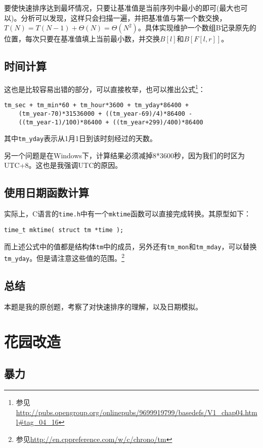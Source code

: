 \documentclass[hyperref,UTF8,12pt,a4paper]{ctexart}
\begin{document}
要使快速排序达到最坏情况，只要让基准值是当前序列中最小的即可(最大也可以)。分析可以发现，这样只会扫描一遍，并把基准值与第一个数交换，$T(N)=T(N-1)+\Theta(N)=\Theta(N^2)$。具体实现维护一个数组B记录原先的位置，每次只要在基准值填上当前最小数，并交换$B[l]$和$B[F[l, r]]$。

\subsection{时间计算}

这也是比较容易出错的部分，可以直接枚举，也可以推出公式\footnote{参见\url{http://pubs.opengroup.org/onlinepubs/9699919799/basedefs/V1_chap04.html\#tag_04_16}}：

\begin{verbatim}
tm_sec + tm_min*60 + tm_hour*3600 + tm_yday*86400 +
    (tm_year-70)*31536000 + ((tm_year-69)/4)*86400 -
    ((tm_year-1)/100)*86400 + ((tm_year+299)/400)*86400
\end{verbatim}

其中\verb|tm_yday|表示从1月1日到该时刻经过的天数。

另一个问题是在Windows下，计算结果必须减掉8*3600秒，因为我们的时区为UTC+8。这也是我强调UTC的原因。

\subsection{使用日期函数计算}

实际上，C语言的\verb|time.h|中有一个\verb|mktime|函数可以直接完成转换。其原型如下：

\begin{verbatim}
time_t mktime( struct tm *time );
\end{verbatim}

而上述公式中的值都是结构体\verb|tm|中的成员，另外还有\verb|tm_mon|和\verb|tm_mday|，可以替换\verb|tm_yday|。但是请注意这些值的范围。\footnote{参见\url{http://en.cppreference.com/w/c/chrono/tm}}

\subsection{总结}

本题是我的原创题，考察了对快速排序的理解，以及日期模拟。

\section{花园改造}

\subsection{暴力}
\end{document}
